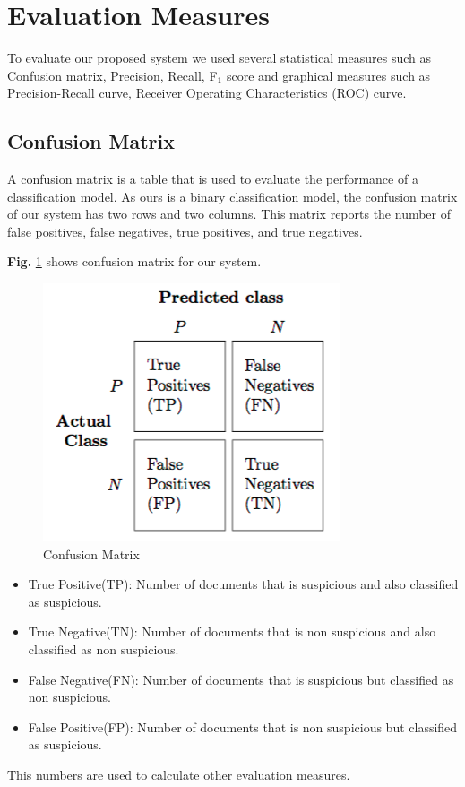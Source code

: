 \section{\textbf{Evaluation Measures}}
To evaluate our proposed system we used several statistical measures such as Confusion matrix, Precision, Recall, F$_1$ score and graphical measures such as Precision-Recall curve, Receiver Operating Characteristics (ROC) curve.
\subsection{\textbf{Confusion Matrix}}
A confusion matrix is a table that is used to evaluate the performance of a classification model. As ours is a binary classification model, the confusion matrix of our system has two rows and two columns. This matrix reports the number of false positives, false negatives, true positives, and true negatives.
\par
\vspace{0.3cm}
\noindent
\textbf{Fig.} \ref{fig:CM} shows confusion matrix for our system.\clearpage
\begin{figure}[h!]
    \centering
    \includegraphics[scale=0.50]{Figures/confusion_matrix_1.png}
    \caption{Confusion Matrix}
    \label{fig:CM}
\end{figure}
\begin{itemize}
    \item True Positive(TP): Number of documents that is suspicious and also classified as suspicious.\vspace{0.2cm}
    \item True Negative(TN): Number of documents that is non suspicious and also classified as non suspicious.\vspace{0.2cm}
    \item False Negative(FN): Number of documents that is suspicious but classified as non suspicious.\vspace{0.2cm}
    \item False Positive(FP): Number of documents that is non suspicious but classified as suspicious. 
\end{itemize}
\noindent
This numbers are used to calculate other evaluation measures.

